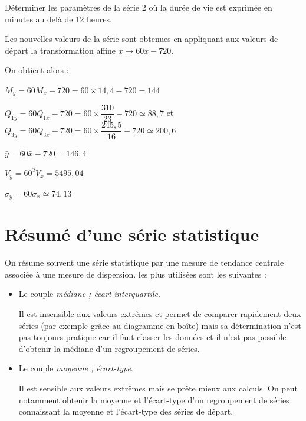 \documentclass[french]{book}
\begin{document}

\begin{exemple}
D\'eterminer les param\`etres de la s\'erie 2 où la dur\'ee de vie est exprim\'ee en minutes au delà de 12 heures.
\end{exemple}


Les nouvelles valeurs de la s\'erie sont obtenues en appliquant aux valeurs de d\'epart la transformation affine $x \mapsto 60x-720$.

On obtient alors :

$M_y=60M_x-720=60\times14,4-720=144$

$Q_{1y}=60Q_{1x}-720=60\times\dfrac{310}{23}-720\simeq 88,7$ \quad et \quad $Q_{3y}=60Q_{3x}-720=60\times\dfrac{245,5}{16}-720\simeq200,6$

$\bar{y}=60\bar{x}-720=146,4$

$V_y=60^2V_x=5495,04$

$\sigma_y=60\sigma_x\simeq74,13$

\section{R\'esum\'e d'une s\'erie statistique}
On r\'esume souvent une s\'erie statistique par une mesure de tendance centrale associ\'ee à une mesure de dispersion. les plus utilis\'ees sont les suivantes :
\begin{itemize}
\item[$\bullet$] Le couple \textit{m\'ediane ; \'ecart interquartile}.

Il est insensible aux valeurs extr\^emes et permet de comparer rapidement deux s\'eries (par exemple grâce au diagramme en boîte) mais sa d\'etermination n'est pas toujours pratique car il faut classer les donn\'ees et il n'est pas possible d'obtenir la m\'ediane d'un regroupement de s\'eries.
\item[$\bullet$] Le couple \textit{moyenne ; \'ecart-type}.

Il est sensible aux valeurs extr\^emes mais se pr\^ete mieux aux calculs. On peut notamment obtenir la moyenne et l'\'ecart-type d'un regroupement de s\'eries connaissant la moyenne et l'\'ecart-type des s\'eries de d\'epart.
\end{itemize}
\end{document}
